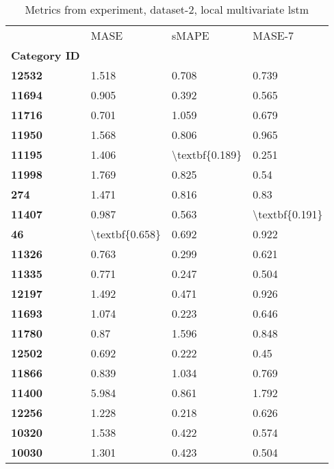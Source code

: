 \begin{table}[h]
\centering
\caption{Metrics from experiment, dataset-2, local multivariate lstm}
\label{table:local-multivariate-lstm-dataset-2}
\begin{tabular}{llll}
\toprule
{} &            MASE &           sMAPE &          MASE-7 \\
\textbf{Category ID} &                 &                 &                 \\
\midrule
\textbf{12532      } &           1.518 &           0.708 &           0.739 \\
\textbf{11694      } &           0.905 &           0.392 &           0.565 \\
\textbf{11716      } &           0.701 &           1.059 &           0.679 \\
\textbf{11950      } &           1.568 &           0.806 &           0.965 \\
\textbf{11195      } &           1.406 &  \textbackslash textbf\{0.189\} &           0.251 \\
\textbf{11998      } &           1.769 &           0.825 &            0.54 \\
\textbf{274        } &           1.471 &           0.816 &            0.83 \\
\textbf{11407      } &           0.987 &           0.563 &  \textbackslash textbf\{0.191\} \\
\textbf{46         } &  \textbackslash textbf\{0.658\} &           0.692 &           0.922 \\
\textbf{11326      } &           0.763 &           0.299 &           0.621 \\
\textbf{11335      } &           0.771 &           0.247 &           0.504 \\
\textbf{12197      } &           1.492 &           0.471 &           0.926 \\
\textbf{11693      } &           1.074 &           0.223 &           0.646 \\
\textbf{11780      } &            0.87 &           1.596 &           0.848 \\
\textbf{12502      } &           0.692 &           0.222 &            0.45 \\
\textbf{11866      } &           0.839 &           1.034 &           0.769 \\
\textbf{11400      } &           5.984 &           0.861 &           1.792 \\
\textbf{12256      } &           1.228 &           0.218 &           0.626 \\
\textbf{10320      } &           1.538 &           0.422 &           0.574 \\
\textbf{10030      } &           1.301 &           0.423 &           0.504 \\
\bottomrule
\end{tabular}
\end{table}
